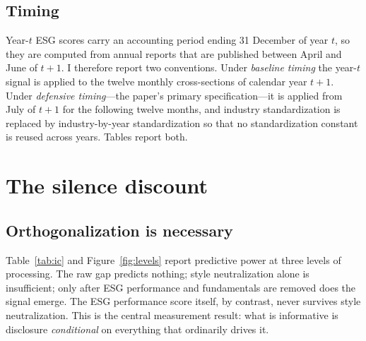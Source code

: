 \documentclass[12pt]{article}
\begin{document}
\subsection{Timing}
Year-$t$ ESG scores carry an accounting period ending 31 December of year $t$,
so they are computed from annual reports that are published between April and
June of $t+1$. I therefore report two conventions. Under \emph{baseline timing}
the year-$t$ signal is applied to the twelve monthly cross-sections of calendar
year $t+1$. Under \emph{defensive timing}---the paper's primary
specification---it is applied from July of $t+1$ for the following twelve
months, and industry standardization is replaced by industry-by-year
standardization so that no standardization constant is reused across years.
Tables report both.

\section{The silence discount}

\subsection{Orthogonalization is necessary}
Table~\ref{tab:ic} and Figure~\ref{fig:levels} report predictive power at three
levels of processing. The raw gap predicts nothing; style neutralization alone
is insufficient; only after ESG performance and fundamentals are removed does
the signal emerge. The ESG performance score itself, by contrast, never
survives style neutralization. This is the central measurement result: what is
informative is disclosure \emph{conditional} on everything that ordinarily
drives it.
\end{document}
